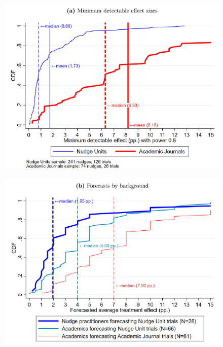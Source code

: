 \documentclass[dvipdfmx,11pt]{beamer}
\begin{document}
\begin{frame}{}
  \begin{figure}
    \centering
    \includegraphics[scale = .6]{fig_tab/os20220412/F4a}
  \end{figure}
\end{frame}

\begin{frame}{}
  \begin{figure}
    \centering
    \includegraphics[scale = .6]{fig_tab/os20220412/F4b}
  \end{figure}
\end{frame}
\end{document}
